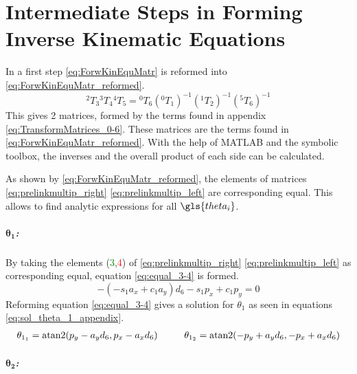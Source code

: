 \chapter{Intermediate Steps in Forming Inverse Kinematic Equations} \label{sec:InvKinEqSteps}

In a first step \ref{eq:ForwKinEquMatr} is reformed into \ref{eq:ForwKinEquMatr_reformed}.
\begin{equation}\label{eq:ForwKinEquMatr_reformed}
\phantom{}^2T_3\phantom{}^3T_4\phantom{}^4T_5 = \phantom{}^0T_6(\phantom{}^0T_1)^{-1}(\phantom{}^1T_2)^{-1}(\phantom{}^5T_6)^{-1}
\end{equation}
This gives 2 matrices, formed by the terms found in appendix \ref{eq:TransformMatrices_0-6}. These matrices are the terms found in \ref{eq:ForwKinEquMatr_reformed}.
With the help of MATLAB and the symbolic toolbox, the inverses and the overall product of each side can be calculated. %




As shown by \ref{eq:ForwKinEquMatr_reformed}, the elements of matrices \ref{eq:prelinkmultip_right} \ref{eq:prelinkmultip_left} are corresponding equal. This allows to find analytic expressions for all $\gls{theta_i}$.

\paragraph{$\pmb{\theta_1}$:}

By taking the elements (\textcolor{green}{3},\textcolor{red}{4}) of \ref{eq:prelinkmultip_right} \ref{eq:prelinkmultip_left} as corresponding equal, equation \ref{eq:equal_3-4} is formed.
\begin{equation}\label{eq:equal_3-4}
-(-s_1a_x + c_1 a_y )d_6 - s_1 p_x +c_1 p_y = 0
\end{equation}
Reforming equation \ref{eq:equal_3-4} gives a solution for $\theta_1$ as seen in equations \ref{eq:sol_theta_1_appendix}.
\begin{multline}\label{eq:sol_theta_1_appendix}
\theta_{1_1} = \operatorname{atan2} ( p_y - a_y d_6 , p_x - a_x d_6) 
\phantom{..........}
\theta_{1_2} = \operatorname{atan2} (-p_y + a_y d_6 ,-p_x + a_x d_6) 
\end{multline}
\medskip

\paragraph{$\pmb{\theta_2}$:}

